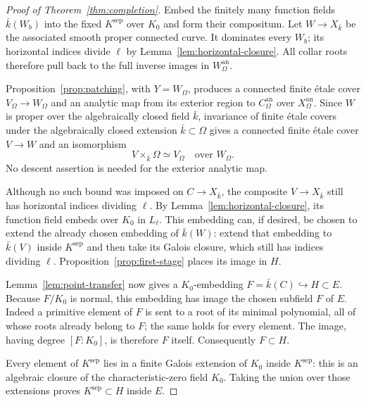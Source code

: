 \begin{proof}[Proof of Theorem~\ref{thm:completion}]
Embed the finitely many function fields $\bar k(W_b)$ into the fixed
$K^{\mathrm{sep}}$ over $K_0$ and form their compositum.  Let
$W\to X_{\bar k}$ be the associated smooth proper connected curve.
It dominates every $W_b$; its horizontal indices divide $\ell$ by
Lemma~\ref{lem:horizontal-closure}.  All collar roots therefore pull
back to the full inverse images in $W_\Omega^{\mathrm{an}}$.

Proposition~\ref{prop:patching}, with $Y=W_\Omega$, produces a
connected finite étale cover $V_\Omega\to W_\Omega$ and an analytic
map from its exterior region to $C_\Omega^{\mathrm{an}}$ over
$X_\Omega^{\mathrm{an}}$.  Since $W$ is proper over the algebraically
closed field $\bar k$, invariance of finite étale covers under the
algebraically closed extension $\bar k\subset\Omega$ \cite{SGA1}
gives a connected finite étale cover $V\to W$ and an isomorphism
\[
                  V\times_{\bar k}\Omega\simeq V_\Omega
                  \quad\text{over }W_\Omega.
\]
No descent assertion is needed for the exterior analytic map.

Although no such bound was imposed on $C\to X_{\bar k}$, the composite
$V\to X_{\bar k}$ still has horizontal indices dividing $\ell$.
By Lemma~\ref{lem:horizontal-closure}, its function
field embeds over $K_0$ in $L_\ell$.  This embedding can, if desired,
be chosen to extend the already chosen embedding of $\bar k(W)$:
extend that embedding to $\bar k(V)$ inside $K^{\mathrm{sep}}$ and
then take its Galois closure, which still has indices dividing $\ell$.
Proposition~\ref{prop:first-stage} places its image in $H$.

Lemma~\ref{lem:point-transfer} now gives a $K_0$-embedding
$F=\bar k(C)\hookrightarrow H\subset E$.  Because $F/K_0$ is
normal, this embedding has image the chosen subfield $F$ of $E$.
Indeed a primitive element of $F$ is sent to a root of its minimal
polynomial, all of whose roots already belong to $F$; the same holds
for every element.  The image, having degree $[F:K_0]$, is therefore
$F$ itself.  Consequently $F\subset H$.

Every element of $K^{\mathrm{sep}}$ lies in a finite Galois extension
of $K_0$ inside $K^{\mathrm{sep}}$: this is an algebraic closure of
the characteristic-zero field $K_0$.  Taking the union over those
extensions proves $K^{\mathrm{sep}}\subset H$ inside $E$.
\end{proof}
